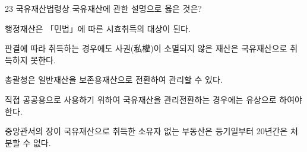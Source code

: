 \begin{question}{23}
국유재산법령상 국유재산에 관한 설명으로 옳은 것은?
\begin{choices}
  \item 행정재산은 「민법」에 따른 시효취득의 대상이 된다.
  \item 판결에 따라 취득하는 경우에도 사권(私權)이 소멸되지 않은 재산은 국유재산으로 취득하지 못한다.
  \item 총괄청은 일반재산을 보존용재산으로 전환하여 관리할 수 있다.
  \item 직접 공공용으로 사용하기 위하여 국유재산을 관리전환하는 경우에는 유상으로 하여야 한다.
  \item 중앙관서의 장이 국유재산으로 취득한 소유자 없는 부동산은 등기일부터 20년간은 처분할 수 없다.
\end{choices}
\end{question}
